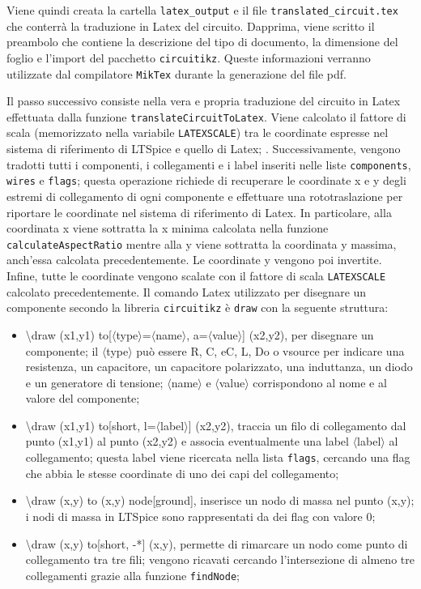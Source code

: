 \noindent
Viene quindi creata la cartella \texttt{latex\_output} e il file \texttt{translated\_circuit.tex} che conterrà la traduzione in Latex del circuito. Dapprima, viene scritto il preambolo che contiene la descrizione del tipo di documento, la dimensione del foglio e l'import del pacchetto \texttt{circuitikz}. Queste informazioni verranno utilizzate dal compilatore \texttt{MikTex} durante la generazione del file pdf.

\noindent
Il passo successivo consiste nella vera e propria traduzione del circuito in Latex effettuata dalla funzione \texttt{translateCircuitToLatex}. Viene calcolato il fattore di scala (memorizzato nella variabile \texttt{LATEXSCALE}) tra le coordinate espresse nel sistema di riferimento di LTSpice e quello di Latex; . Successivamente, vengono tradotti tutti i componenti, i collegamenti e i label inseriti nelle liste \texttt{components}, \texttt{wires} e \texttt{flags}; questa operazione richiede di recuperare le coordinate x e y degli estremi di collegamento di ogni componente e effettuare una rototraslazione per riportare le coordinate nel sistema di riferimento di Latex. In particolare, alla coordinata x viene sottratta la x minima calcolata nella funzione \texttt{calculateAspectRatio} mentre alla y viene sottratta la coordinata y massima, anch'essa calcolata precedentemente. Le coordinate y vengono poi invertite. Infine, tutte le coordinate vengono scalate con il fattore di scala \texttt{LATEXSCALE} calcolato precedentemente. Il comando Latex utilizzato per disegnare un componente secondo la libreria \texttt{circuitikz} è \texttt{draw} con la seguente struttura:
\begin{itemize}
	\item \textbackslash draw (x1,y1) to[$\langle$type$\rangle$=$\langle$name$\rangle$, a=$\langle$value$\rangle$] (x2,y2), per disegnare un componente; il $\langle$type$\rangle$ può essere R, C, eC, L, Do o vsource per indicare una resistenza, un capacitore, un capacitore polarizzato, una induttanza, un diodo e un generatore di tensione; $\langle$name$\rangle$ e $\langle$value$\rangle$ corrispondono al nome e al valore del componente;
	\item \textbackslash draw (x1,y1) to[short, l=$\langle$label$\rangle$] (x2,y2), traccia un filo di collegamento dal punto (x1,y1) al punto (x2,y2) e associa eventualmente una label $\langle$label$\rangle$ al collegamento; questa label viene ricercata nella lista \texttt{flags}, cercando una flag che abbia le stesse coordinate di uno dei capi del collegamento;
	\item \textbackslash draw (x,y) to (x,y) node[ground]{}, inserisce un nodo di massa nel punto (x,y); i nodi di massa in LTSpice sono rappresentati da dei flag con valore 0;
	\item \textbackslash draw (x,y) to[short, -*] (x,y), permette di rimarcare un nodo come punto di collegamento tra tre fili; vengono ricavati cercando l'intersezione di almeno tre collegamenti grazie alla funzione \texttt{findNode};
\end{itemize}
